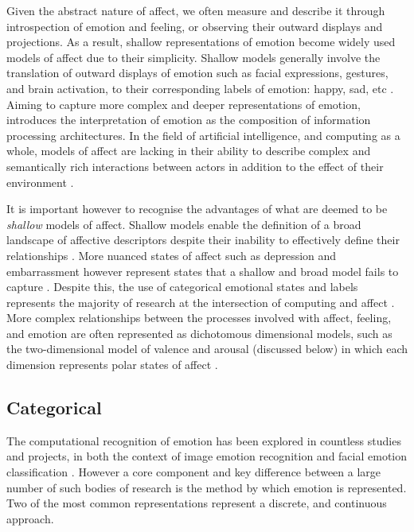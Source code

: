 \documentclass{article}
\begin{document}
Given the abstract nature of affect, we often measure and describe it through introspection of emotion and feeling, or observing their outward displays and projections.
As a result, shallow representations of emotion become widely used models of affect due to their simplicity.
Shallow models generally involve the translation of outward displays of emotion such as facial expressions, gestures, and brain activation, to their corresponding labels of emotion: happy, sad, etc \citep{sloman2001beyond}.
Aiming to capture more complex and deeper representations of emotion, \citet{sloman2001beyond} introduces the interpretation of emotion as the composition of information processing architectures.
In the field of artificial intelligence, and computing as a whole, models of affect are lacking in their ability to describe complex and semantically rich interactions between actors in addition to the effect of their environment \citep{sloman2001beyond}.

It is important however to recognise the advantages of what are deemed to be \textit{shallow} models of affect.
Shallow models enable the definition of a broad landscape of affective descriptors despite their inability to effectively define their relationships \citep{sloman2001beyond}.
More nuanced states of affect such as depression and embarrassment however represent states that a shallow and broad model fails to capture \citep{gunes2011emotion}.
Despite this, the use of categorical emotional states and labels represents the majority of research at the intersection of computing and affect \citep{gunes2011emotion}.
More complex relationships between the processes involved with affect, feeling, and emotion are often represented as dichotomous dimensional models, such as the two-dimensional model of valence and arousal (discussed below) in which each dimension represents polar states of affect \citep{grandjean2008conscious}.


\subsection{Categorical}

The computational recognition of emotion has been explored in countless studies and projects, in both the context of image emotion recognition \citep{machajdik2010affective,zhao2014exploring,kim2018building} and facial emotion classification \citep{mollahosseini2016going}.
However a core component and key difference between a large number of such bodies of research is the method by which emotion is represented.
Two of the most common representations represent a discrete, and continuous approach.
\end{document}
